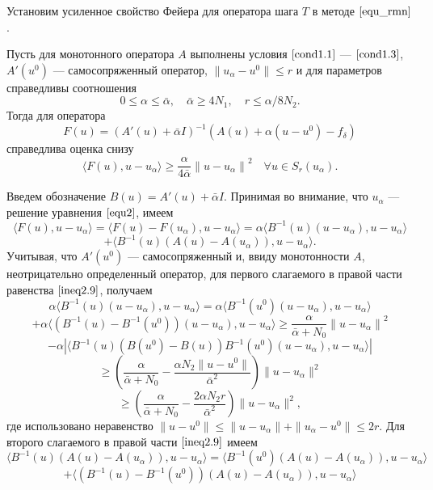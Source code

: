 Установим усиленное свойство Фейера для оператора шага $T$ в методе $\eqref{equ_rmn}$.
\begin{theorem}\label{teo2.2} Пусть для монотонного оператора $A$ выполнены условия $\eqref{cond1.1}$ --- $\eqref{cond1.3}$, $A'(u^0)$ --- самосопряженный оператор, $\|u_\alpha-u^0\|\le r$ и для параметров справедливы соотношения 
	\begin{equation}\label{cond2.7}
	0\le\alpha\le\bar\alpha,\quad\bar\alpha\ge 4N_1,\quad r\le\alpha/8N_2.
	\end{equation}
	Тогда для оператора
	$$ F(u)=(A'(u)+\bar\alpha I)^{-1}(A(u)+\alpha(u-u^0)-f_\delta) $$
	справедлива оценка снизу
	\begin{equation}\label{est2.8}
	\langle F(u), u-u_\alpha\rangle\ge\frac{\alpha}{4\bar\alpha}{\|u-u_\alpha\|}^2 \quad \forall u \in S_r(u_\alpha).
	\end{equation}
\end{theorem}
\proof Введем обозначение $B(u)=A'(u)+\bar\alpha I$. Принимая во внимание, что $u_\alpha$ --- решение уравнения $\eqref{equ2}$, имеем
$$
\langle F(u), u-u_\alpha\rangle=\langle F(u)-F(u_\alpha), u-u_\alpha\rangle=\alpha\langle B^{-1}(u)(u-u_\alpha), u-u_\alpha\rangle$$ \begin{equation}\label{ineq2.9}+\langle B^{-1}(u)(A(u)-A(u_\alpha)), u-u_\alpha\rangle.
\end{equation}
Учитывая, что $A'(u^0)$ --- самосопряженный и, ввиду монотонности $A$, неотрицательно определенный оператор, для первого слагаемого в правой части равенства $\eqref{ineq2.9}$, получаем
$$\alpha\langle B^{-1}(u)(u-u_\alpha), u-u_\alpha\rangle=\alpha\langle B^{-1}(u^0)(u-u_\alpha), u-u_\alpha\rangle$$ $$+\alpha\langle (B^{-1}(u)-B^{-1}(u^0))(u-u_\alpha), u-u_\alpha\rangle \ge \frac{\alpha}{\bar\alpha+N_0}{\|u-u_\alpha\|}^2$$
$$ - \alpha|\langle B^{-1}(u)(B(u^0)-B(u))B^{-1}(u^0)(u-u_\alpha), u-u_\alpha\rangle| $$
$$\ge \left( \frac{\alpha}{\bar\alpha+N_0}-\frac{\alpha N_2\|u-u^0\|}{{\bar\alpha}^2}\right)\|u-u_\alpha\|^2$$
\begin{equation}\label{ineq2.10}
\ge\left(\frac{\alpha}{\bar\alpha+N_0}-\frac{2\alpha N_2r}{{\bar\alpha}^2}\right)\|u-u_\alpha\|^2,
\end{equation} где использовано неравенство $\|u-u^0\|\le\|u-u_\alpha\|+\|u_\alpha-u^0\|\le 2r$.
Для второго слагаемого в правой части $\eqref{ineq2.9}$ имеем
$$ \langle B^{-1}(u)(A(u)-A(u_\alpha)), u-u_\alpha\rangle= \langle B^{-1}(u^0)(A(u)-A(u_\alpha)), u-u_\alpha\rangle$$
$$+\langle (B^{-1}(u)-B^{-1}(u^0))(A(u)-A(u_\alpha)), u-u_\alpha\rangle$$
